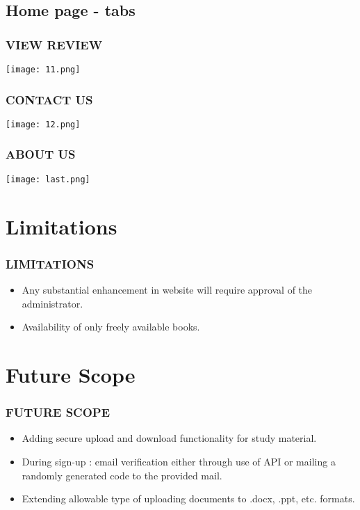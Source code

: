 \documentclass{beamer}
\begin{document}
\subsection{Home page - tabs}
\begin{frame}\frametitle{VIEW REVIEW}
		\texttt{[image: 11.png]}
\end{frame}

\begin{frame}\frametitle{CONTACT US}
		\texttt{[image: 12.png]}
\end{frame}

\begin{frame}\frametitle{ABOUT US}
		\texttt{[image: last.png]}
\end{frame}





\section{Limitations}
\begin{frame}\frametitle{LIMITATIONS}
\begin{block}{}
	\begin{itemize}
		\item \textrm Any substantial enhancement in website will require approval of the administrator.
		\item \textrm Availability of only freely available books.
	\end{itemize}
\end{block}
\end{frame}

\section{Future Scope}
\begin{frame}\frametitle{FUTURE SCOPE}
 \begin{block}{}
\begin{itemize}
    \item Adding secure upload and download functionality for study material.
    \item During sign-up : email verification either through use of API or mailing a randomly generated code to the provided mail.
    \item Extending allowable type of uploading documents to .docx, .ppt, etc. formats.
\end{itemize}
\end{block}
\end{frame}
\end{document}
